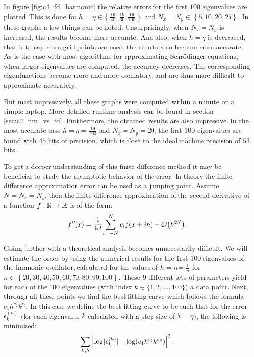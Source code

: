 In figure \ref{fig:c4_fd_harmonic} the relative errors for the first $100$ eigenvalues are plotted. This is done for $h = \eta \in \left\{\frac{19}{40}, \frac{19}{60}, \frac{19}{100}\right\}$ and $N_x = N_y \in \left\{ 5, 10, 20, 25 \right\}$. In these graphs a few things can be noted. Unsurprisingly, when $N_x = N_y$ is increased, the results become more accurate. And also, when $h = \eta$ is decreased, that is to say more grid points are used, the results also become more accurate. As is the case with most algorithms for approximating Schrödinger equations, when larger eigenvalues are computed, the accuracy decreases. The corresponding eigenfunctions become more and more oscillatory, and are thus more difficult to approximate accurately.

But most impressively, all these graphs were computed within a minute on a simple laptop. More detailed runtime analysis can be found in section \ref{sec:c4_nm_vs_fd}. Furthermore, the obtained results are also impressive. In the most accurate case $h= \eta = \frac{19}{100}$ and $N_x = N_y = 20$, the first $100$ eigenvalues are found with $45$ bits of precision, which is close to the ideal machine precision of $53$ bits.

To get a deeper understanding of this finite difference method it may be beneficial to study the asymptotic behavior of the error. In theory the finite difference approximation error can be used as a jumping point. Assume $N = N_x = N_y$, then the finite difference approximation of the second derivative of a function $f : \mathbb{R} \to \mathbb{R}$ is of the form:
$$
    f''(x) = \frac{1}{h^2}\sum_{i=-N}^{N} c_{i} f(x + i h) + \OO\mleft(h^{2N}\mright)\text{.}
$$

Going further with a theoretical analysis becomes unnecessarily difficult. We will estimate the order by using the numerical results for the first $100$ eigenvalues of the harmonic oscillator, calculated for the values of $h = \eta = \frac{1}{n}$ for $n \in \left\{20, 30, 40, 50, 60, 70, 80, 90, 100\right\}$. These $9$ different sets of parameters yield for each of the $100$ eigenvalues (with index $k \in \{1, 2, \dots, 100\}$) a data point. Next, through all these points we find the best fitting curve which follows the formula $c_1 h^{c_2} k^{c_3}$. In this case we define the best fitting curve to be such that for the error $\epsilon_k^{(h)}$ (for each eigenvalue $k$ calculated with a step size of $h = \eta$), the following is minimized:
$$
    \sum_{k, h}\left|\log|\epsilon_{k}^{(h)}| - \log\mleft(c_1 h^{c_2} k^{c_3}\mright)\right|^2 \text{.}
$$

